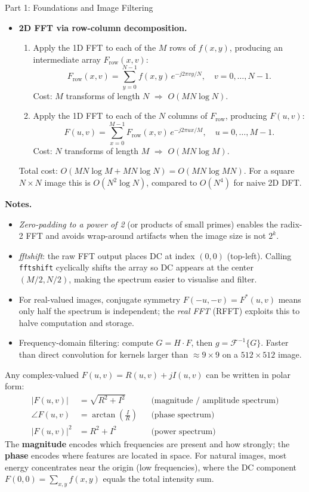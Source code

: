 \documentclass[letterpaper]{article}
\begin{document}
\begin{notes}{Part 1: Foundations and Image Filtering}
\begin{itemize}
    \item\textbf{2D FFT via row-column decomposition.}
    \begin{enumerate}
        \item Apply the 1D FFT to each of the $M$ rows of $f(x,y)$, producing an intermediate array $F_{\mathrm{row}}(x,v)$:
        $$F_{\mathrm{row}}(x,v) = \sum_{y=0}^{N-1} f(x,y)\,e^{-j2\pi vy/N}, \quad v=0,\dots,N-1.$$
        Cost: $M$ transforms of length $N$ $\Rightarrow$ $O(MN\log N)$.
        \item Apply the 1D FFT to each of the $N$ columns of $F_{\mathrm{row}}$, producing $F(u,v)$:
        $$F(u,v) = \sum_{x=0}^{M-1} F_{\mathrm{row}}(x,v)\,e^{-j2\pi ux/M}, \quad u=0,\dots,M-1.$$
        Cost: $N$ transforms of length $M$ $\Rightarrow$ $O(MN\log M)$.
    \end{enumerate}
    Total cost: $O(MN\log M + MN\log N) = O(MN\log MN)$. For a square $N\times N$ image this is $O(N^2 \log N)$, compared to $O(N^4)$ for naive 2D DFT.
\end{itemize}



\textbf{Notes.}
\begin{itemize}
    \item \emph{Zero-padding to a power of 2} (or products of small primes) enables the radix-2 FFT and avoids wrap-around artifacts when the image size is not $2^k$.
    \item \emph{fftshift}: the raw FFT output places DC at index $(0,0)$ (top-left). Calling \texttt{fftshift} cyclically shifts the array so DC appears at the center $(M/2,N/2)$, making the spectrum easier to visualise and filter.
    \item For real-valued images, conjugate symmetry $F(-u,-v)=F^*(u,v)$ means only half the spectrum is independent; the \emph{real FFT} (RFFT) exploits this to halve computation and storage.
    \item Frequency-domain filtering: compute $G = H\cdot F$, then $g = \mathcal{F}^{-1}\{G\}$. Faster than direct convolution for kernels larger than $\approx 9\times9$ on a $512\times512$ image.
\end{itemize}



Any complex-valued $F(u,v) = R(u,v) + j I(u,v)$ can be written in polar form:
\begin{align*}
    |F(u,v)| &= \sqrt{R^2 + I^2} && \text{(magnitude / amplitude spectrum)}\\
    \angle F(u,v) &= \arctan\!\left(\frac{I}{R}\right) && \text{(phase spectrum)}\\
    |F(u,v)|^2 &= R^2 + I^2 && \text{(power spectrum)}
\end{align*}
The \textbf{magnitude} encodes which frequencies are present and how strongly; the \textbf{phase} encodes where features are located in space. For natural images, most energy concentrates near the origin (low frequencies), where the DC component $F(0,0) = \sum_{x,y} f(x,y)$ equals the total intensity sum.


\end{notes}
\end{document}
